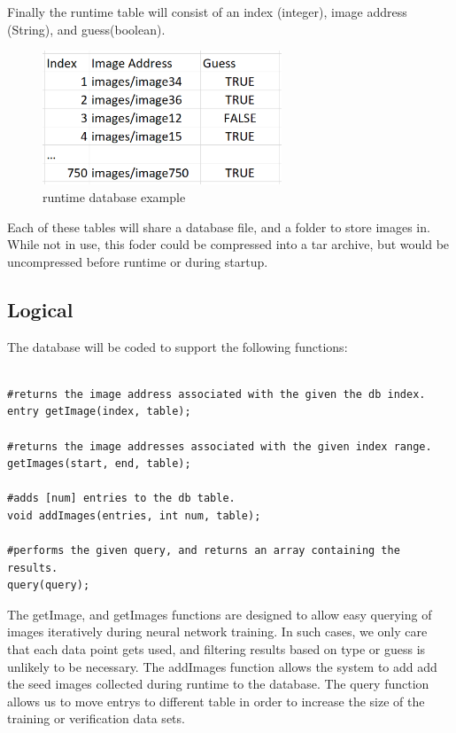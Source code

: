 Finally the runtime table will consist of an index (integer), image address (String), and guess(boolean).

\begin{figure}[h]
\caption{runtime database example}
\centering
\includegraphics[height=4cm]{runtimedb}
\end{figure}

Each of these tables will share a database file, and a folder to store images in.
While not in use, this foder could be compressed into a tar archive, but would be uncompressed before runtime or during startup.




\subsection{Logical}

The database will be coded to support the following functions:

\begin{verbatim}

#returns the image address associated with the given the db index.
entry getImage(index, table);

#returns the image addresses associated with the given index range.
getImages(start, end, table);

#adds [num] entries to the db table.
void addImages(entries, int num, table);

#performs the given query, and returns an array containing the results.
query(query);

\end{verbatim}

The getImage, and getImages functions are designed to allow easy querying of images iteratively during neural network training. In such cases, we only care that each data point gets used, and filtering results based on type or guess is unlikely to be necessary.
The addImages function allows the system to add add the seed images collected during runtime to the database.
The query function allows us to move entrys to different table in order to increase the size of the training or verification data sets. 

